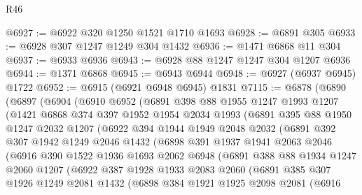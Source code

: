 \begin{lexlean}{R46}
\begin{coremodule}
@6927 := @6922 @320 @1250 @1521 @1710 @1693
@6928 := @6891 @305
@6933 := @6928 @307 @1247 @1249 @304 @1432
@6936 := @1471 @6868 @11 @304
@6937 := @6933 @6936
@6943 := @6928 @88 @1247 @1247 @304 @1207 @6936
@6944 := @1371 @6868
@6945 := @6943 @6944
@6948 := @6927 (@6937 @6945) @1722
@6952 := @6915 (@6921 @6948 @6945) @1831
@7115 := @6878
    (@6890
      (@6897
        (@6904
          (@6910
            @6952
            (@6891
              @398
              @88
              @1955
              @1247
              @1993
              @1207
              (@1421
                @6868
                @374
                @397
                @1952
                @1954
                @2034
                @1993
                (@6891
                  @395
                  @88
                  @1950
                  @1247
                  @2032
                  @1207
                  (@6922
                    @394
                    @1944
                    @1949
                    @2048
                    @2032
                    (@6891
                      @392
                      @307
                      @1942
                      @1249
                      @2046
                      @1432
                      (@6898
                        @391
                        @1937
                        @1941
                        @2063
                        @2046
                        (@6916
                          @390
                          @1522
                          @1936
                          @1693
                          @2062
                          @6948
                          (@6891
                            @388
                            @88
                            @1934
                            @1247
                            @2060
                            @1207
                            (@6922
                              @387
                              @1928
                              @1933
                              @2083
                              @2060
                              (@6891
                                @385
                                @307
                                @1926
                                @1249
                                @2081
                                @1432
                                (@6898
                                  @384
                                  @1921
                                  @1925
                                  @2098
                                  @2081
                                  (@6916

\end{coremodule}
\end{lexlean}
